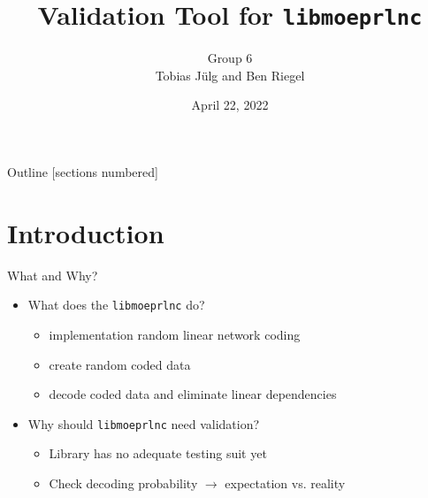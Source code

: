 \documentclass[t]{beamer} %
\title{Validation Tool for \texttt{libmoeprlnc}}
\date{April 22, 2022}
\author{Group 6\\Tobias Jülg and Ben Riegel}
\institute[TUM]{Technical University of Munich}
\begin{document}
\maketitle


\begin{frame}{Outline}
	[sections numbered]
	\tableofcontents %
\end{frame}

\section{Introduction}
\begin{frame}{What and Why?}
	\begin{itemize}
		\item What does the \texttt{libmoeprlnc} do? 
		      \begin{itemize}
		      	\item implementation random linear network coding
		      	\item create random coded data
		      	\item decode coded data and eliminate linear dependencies
		      \end{itemize}
	\end{itemize}
	
	\begin{itemize}
		\item Why should \texttt{libmoeprlnc} need validation? 
		      \begin{itemize}
		      	\item Library has no adequate testing suit yet
		      	\item Check decoding probability $\rightarrow$ expectation vs. reality
		      \end{itemize}
	\end{itemize}
\end{frame}

\end{document}
